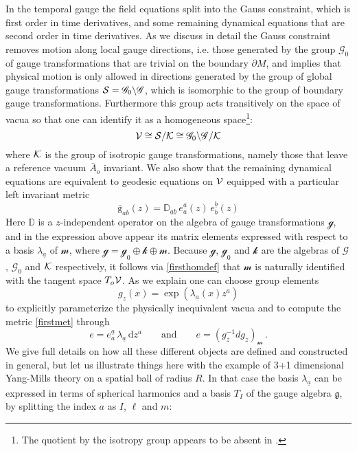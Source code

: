 \documentclass[11pt,a4paper]{article}
\def\calg{{\mathscr G}}
\def\calk{{\cal K}}
\def\calsk{\boldsymbol{\mathscr k}}
\def\calsg{{\boldsymbol{\mathscr g}}}
\def\calsm{{\boldsymbol{\mathscr m}}}
\def\cals{{\cal S}}
\def\calv{{\cal V}}
\def\ua{{\underline{a}}}
\def\ub{{\underline{b}}}
\def\rg{{\mathrm{g}}}
\def\rd{{\mathrm{d}}}
\def\Dperp{{\mathbb{D}}}
\begin{document}
    In the temporal gauge the field equations split into the Gauss constraint, which is first order in time derivatives, and some remaining dynamical equations that are second order in time derivatives. As we discuss in detail the Gauss constraint removes motion along local gauge directions, i.e. those generated by the group $\calg_0$ of gauge transformations that are trivial on the boundary $\partial M$, and implies that physical motion is only allowed in directions generated by the group of global gauge transformations $\cals=\calg_0\backslash \calg$, which is isomorphic to the group of boundary gauge transformations. Furthermore this group acts transitively on the space of vacua so that one can identify it as a homogeneous space\footnote{The quotient by the isotropy group appears to be absent in \cite{Lechtenfeld:2015uka}.}:
    \begin{equation}
    \calv\cong\cals/\calk\cong\calg_0\backslash\calg/\calk\label{firsthomdef}
    \end{equation}
    where $\calk$ is the group of isotropic gauge transformations, namely those that leave a reference vacuum $\bar A_o$ invariant. We also show that the remaining dynamical equations are equivalent to geodesic equations on $\calv$ equipped with a particular left invariant metric
    \begin{equation} 
    \bar{\rg}_{ab}(z)=\mathbb{D}_{\ua\ub}\,e^\ua_a(z)\,e^\ub_b(z)\label{firstmet}
    \end{equation}
    Here $\Dperp$ is a $z$-independent operator on the algebra of gauge transformations $\calsg$, and in the expression above appear its matrix elements expressed with respect to a basis $\lambda_\ua$ of $\calsm$, where $\calsg=\calsg_0\oplus\calsk\oplus\calsm$. Because $\calsg$, $\calsg_0$ and $\calsk$ are the algebras of $\calg$, $\calg_0$ and $\calk$ respectively, it follows via \eqref{firsthomdef} that $\calsm$ is naturally identified with the tangent space $T_o\calv$. As we explain one can choose group elements
    \begin{equation}
    g_z(x)=\exp(\lambda_\ua (x)z^a)
    \end{equation}
    to explicitly parameterize the physically inequivalent vacua and to compute the metric  \eqref{firstmet} through
    \begin{equation}
    e=e^\ua_a\,\lambda_\ua\,\rd z^a\qquad\mbox{and}\qquad e=(g_z^{-1}dg_z)_\calsm\,.
    \end{equation}
    We give full details on how all these different objects are defined and constructed in general, but let us illustrate things here with the example of 3+1 dimensional Yang-Mills theory on a spatial ball of radius $R$. In that case the basis $\lambda_\ua$ can be expressed in terms of spherical harmonics and a basis $T_I$ of the gauge algebra $\mathfrak{g}$, by splitting the index $a$ as $I$, $\ell$ and $m$:
\end{document}
